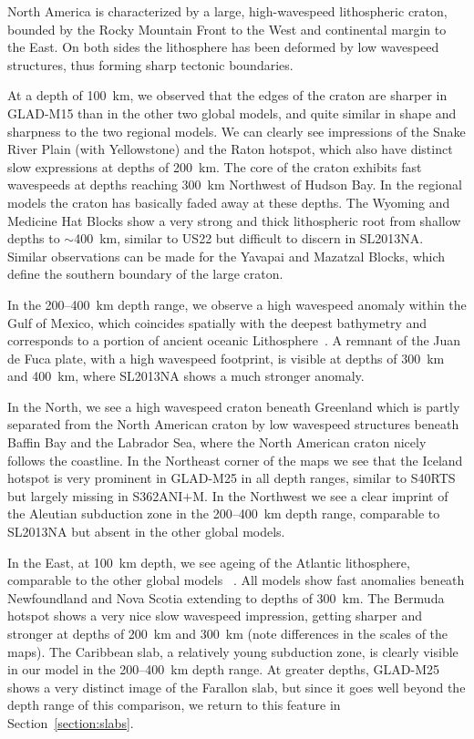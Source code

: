 \documentclass[extra,mreferee]{gji}
\begin{document}
North America is characterized by a large, high-wavespeed lithospheric craton,
bounded by the Rocky Mountain Front to the West and continental
margin to the East. On both sides the lithosphere has been deformed by
low wavespeed structures, thus forming sharp tectonic boundaries.

At a depth of 100~km, we observed that the edges of the craton are sharper in
GLAD-M15 than in the other two global models,
and quite similar in shape and sharpness to the two regional models.
We can clearly see impressions of the Snake River Plain (with Yellowstone)
and the Raton hotspot, which also have distinct slow expressions at depths of 200~km.
The core of the craton exhibits fast wavespeeds at depths reaching 300~km Northwest of
Hudson Bay.
In the regional models the craton has basically faded away at these depths.
The Wyoming and Medicine Hat Blocks show a very strong and thick lithospheric
root from shallow depths to $\sim$400~km, similar to US22 but
difficult to discern in SL2013NA.
Similar observations can be made for the Yavapai and
Mazatzal Blocks, which define the southern boundary of the large craton.

In the 200--400~km depth range, we observe a high wavespeed
anomaly within the Gulf of Mexico, which coincides spatially with the deepest
bathymetry and corresponds to a portion of ancient oceanic
Lithosphere~\citep{muller2008}.
A remnant of the Juan de Fuca plate,
with a high wavespeed footprint, is visible at depths of 300~km and 400~km,
where SL2013NA shows a much stronger anomaly.

In the North, we see a high wavespeed craton beneath Greenland which is partly
separated from the North American craton by low wavespeed structures beneath
Baffin Bay and the Labrador Sea, where the North American craton nicely follows
the coastline.
In the Northeast corner of the maps we see that the Iceland hotspot is very
prominent in GLAD-M25 in all depth ranges, similar to S40RTS but largely missing
in S362ANI$+$M. In the Northwest we see a clear imprint of the Aleutian
subduction zone in the 200--400~km depth range, comparable to SL2013NA but absent
in the other global models.

In the East, at 100~km depth,
we see ageing of the Atlantic lithosphere, comparable to the other global models
~\citep{muller2008, schaeffer2014imaging}.
All models show fast anomalies beneath Newfoundland and Nova Scotia extending to
depths of 300~km. The Bermuda hotspot shows a very nice slow wavespeed impression,
getting sharper and stronger at depths of 200~km and 300~km (note differences in
the scales of the maps).
The Caribbean slab, a relatively young subduction zone, is clearly
visible in our model in the 200--400~km depth range.
At greater depths,
GLAD-M25 shows a very distinct image of the Farallon slab,
but since it goes well beyond the depth range of this comparison,
we return to this feature in Section~\ref{section:slabs}.
\end{document}
